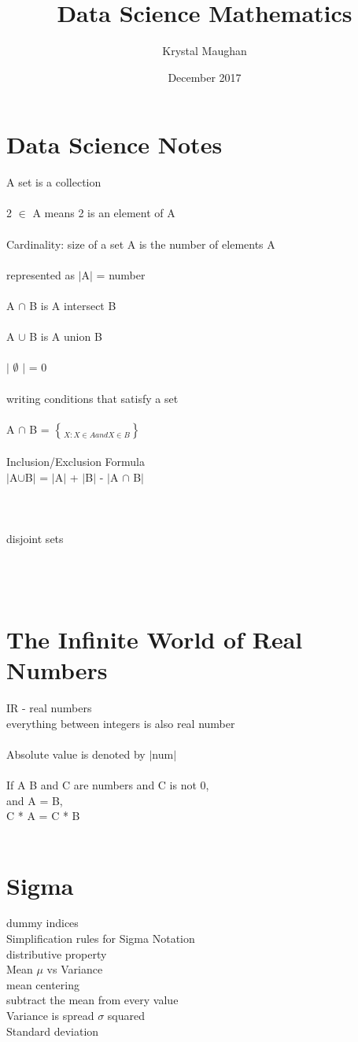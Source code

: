 \documentclass{article}
\title{Data Science Mathematics}
\author{Krystal Maughan }
\date{December 2017}
\begin{document}
\maketitle


\section{Data Science Notes}
A set is a collection
\\
\\
2 ${\in}$ A means 2 is an element of A
\\
\\
Cardinality: size of a set A is the number of elements A
\\
\\
represented as $|$A$|$ = number
\\
\\
A $\cap$ B is A intersect B
\\
\\
A $\cup$ B is A union B
\\
\\
$|$ $\emptyset$ $|$ = 0
\\
\\
writing conditions that satisfy a set 
\\
\\
A $\cap$ B = $\brace X: X \in A and X \in B$ 
\\
\\
Inclusion/Exclusion Formula
\\
$|$A$\cup$B$|$ = $|$A$|$ + $|$B$|$ - $|$A $\cap$ B$|$
\\
\\
\\
\\
disjoint sets
\\
\\
\\
\\
\section{The Infinite World of Real Numbers}
IR - real numbers
\\
everything between integers is also real number
\\
\\
Absolute value is denoted by $|$num$|$
\\
\\
If A B and C are numbers and C is not 0,
\\
and A = B,
\\
C * A = C * B
\\
\\
\section{Sigma}
dummy indices
\\
Simplification rules for Sigma Notation
\\
distributive property
\\
Mean $\mu$ vs Variance
\\
mean centering
\\
subtract the mean from every value 
\\
Variance is spread $\sigma$ squared
\\
Standard deviation 
\end{document}
